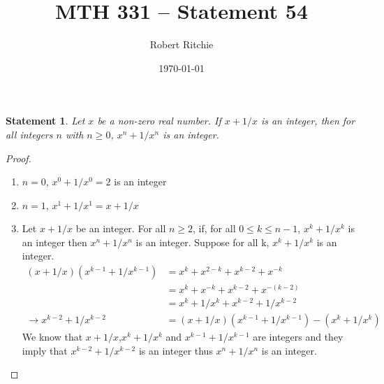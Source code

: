\documentclass[11pt]{article}
\newtheorem{statement}{Statement}%
\begin{document}
\author{Robert Ritchie}
\title{MTH 331 -- Statement 54}
\date{\today}

\maketitle

\begin{statement}
Let $x$ be a non-zero real number. If $x+1/x$ is an integer, then for all integers $n$ with $n\geq0$, $x^n+1/x^n$ is an integer. 
\end{statement}

\begin{proof}
\begin{enumerate}
\item $n=0$, $x^0+1/x^0=2$ is an integer
\item $n=1$, $x^1+1/x^1=x+1/x$
\item Let $x+1/x$ be an integer. For all $n\geq2$, if, for all $0\leq k\leq n-1$, $x^k+1/x^k$ is an integer then $x^n+1/x^n$ is an integer. 
Suppose for all k, $x^k+1/x^k$ is an integer.
\begin{align*}
(x+1/x)(x^{k-1}+1/x^{k-1})&=x^k+x^{2-k}+x^{k-2}+x^{-k}\\
&=x^k+x^{-k}+x^{k-2}+x^{-(k-2)}\\
&=x^k+1/x^k+x^{k-2}+1/x^{k-2}\\
\rightarrow x^{k-2}+1/x^{k-2}&=(x+1/x)(x^{k-1}+1/x^{k-1})-(x^k+1/x^k)
\end{align*}
We know that $x+1/x$,$x^{k}+1/x^{k}$  and $x^{k-1}+1/x^{k-1}$ are integers and they imply that $x^{k-2}+1/x^{k-2}$ is an integer thus $x^n+1/x^n$ is an integer.
\end{enumerate}
\end{proof}
\end{document}
